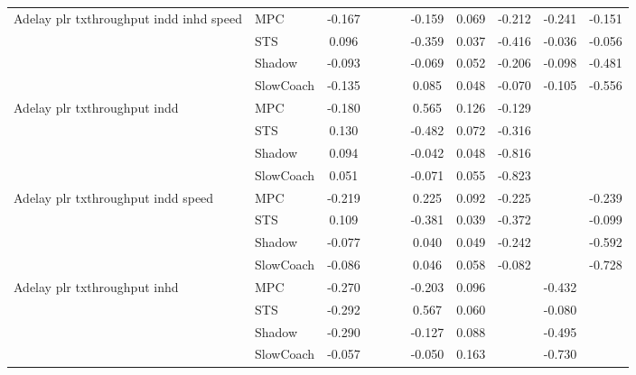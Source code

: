 \begin{tabular}{|l|l|*{9}{c|}}
\midrule
Adelay plr txthroughput indd inhd speed    & MPC &   -0.167 &        &        &     & -0.159 &  0.069 &  -0.212 &  -0.241 &   -0.151 \\
                              & STS &    0.096 &        &        &     & -0.359 &  0.037 &  -0.416 &  -0.036 &   -0.056 \\
                              & Shadow &   -0.093 &        &        &     & -0.069 &  0.052 &  -0.206 &  -0.098 &   -0.481 \\
                              & SlowCoach &   -0.135 &        &        &     &  0.085 &  0.048 &  -0.070 &  -0.105 &   -0.556 \\
\midrule
Adelay plr txthroughput indd    & MPC &   -0.180 &        &        &     &  0.565 &  0.126 &  -0.129 &      &       \\
                              & STS &    0.130 &        &        &     & -0.482 &  0.072 &  -0.316 &      &       \\
                              & Shadow &    0.094 &        &        &     & -0.042 &  0.048 &  -0.816 &      &       \\
                              & SlowCoach &    0.051 &        &        &     & -0.071 &  0.055 &  -0.823 &      &       \\
\midrule
Adelay plr txthroughput indd speed    & MPC &   -0.219 &        &        &     &  0.225 &  0.092 &  -0.225 &      &   -0.239 \\
                              & STS &    0.109 &        &        &     & -0.381 &  0.039 &  -0.372 &      &   -0.099 \\
                              & Shadow &   -0.077 &        &        &     &  0.040 &  0.049 &  -0.242 &      &   -0.592 \\
                              & SlowCoach &   -0.086 &        &        &     &  0.046 &  0.058 &  -0.082 &      &   -0.728 \\
\midrule
Adelay plr txthroughput inhd    & MPC &   -0.270 &        &        &     & -0.203 &  0.096 &      &  -0.432 &       \\
                              & STS &   -0.292 &        &        &     &  0.567 &  0.060 &      &  -0.080 &       \\
                              & Shadow &   -0.290 &        &        &     & -0.127 &  0.088 &      &  -0.495 &       \\
                              & SlowCoach &   -0.057 &        &        &     & -0.050 &  0.163 &      &  -0.730 &       \\

\end{tabular}
